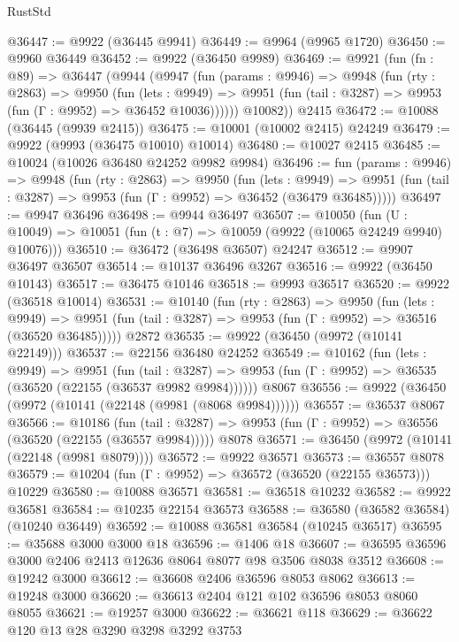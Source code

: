 \begin{lexlean}{RustStd}
\begin{coremodule}
@36447 := @9922 (@36445 @9941)
@36449 := @9964 (@9965 @1720)
@36450 := @9960 @36449
@36452 := @9922 (@36450 @9989)
@36469 := @9921
    (fun (fn : @89) =>
    @36447
      (@9944
        (@9947
          (fun (params : @9946) =>
          @9948
            (fun (rty : @2863) =>
            @9950
              (fun (lets : @9949) =>
              @9951 (fun (tail : @3287) => @9953 (fun (Γ : @9952) => @36452 @10036))))))
        @10082))
    @2415
@36472 := @10088 (@36445 (@9939 @2415))
@36475 := @10001 (@10002 @2415) @24249
@36479 := @9922 (@9993 (@36475 @10010) @10014)
@36480 := @10027 @2415
@36485 := @10024 (@10026 @36480 @24252 @9982 @9984)
@36496 := fun (params : @9946) =>
  @9948
    (fun (rty : @2863) =>
    @9950
      (fun (lets : @9949) =>
      @9951 (fun (tail : @3287) => @9953 (fun (Γ : @9952) => @36452 (@36479 @36485)))))
@36497 := @9947 @36496
@36498 := @9944 @36497
@36507 := @10050
    (fun (U : @10049) => @10051 (fun (t : @7) => @10059 (@9922 (@10065 @24249 @9940) @10076)))
@36510 := @36472 (@36498 @36507) @24247
@36512 := @9907 @36497 @36507
@36514 := @10137 @36496 @3267
@36516 := @9922 (@36450 @10143)
@36517 := @36475 @10146
@36518 := @9993 @36517
@36520 := @9922 (@36518 @10014)
@36531 := @10140
    (fun (rty : @2863) =>
    @9950
      (fun (lets : @9949) =>
      @9951 (fun (tail : @3287) => @9953 (fun (Γ : @9952) => @36516 (@36520 @36485)))))
    @2872
@36535 := @9922 (@36450 (@9972 (@10141 @22149)))
@36537 := @22156 @36480 @24252
@36549 := @10162
    (fun (lets : @9949) =>
    @9951
      (fun (tail : @3287) =>
      @9953 (fun (Γ : @9952) => @36535 (@36520 (@22155 (@36537 @9982 @9984))))))
    @8067
@36556 := @9922 (@36450 (@9972 (@10141 (@22148 (@9981 (@8068 @9984))))))
@36557 := @36537 @8067
@36566 := @10186
    (fun (tail : @3287) => @9953 (fun (Γ : @9952) => @36556 (@36520 (@22155 (@36557 @9984)))))
    @8078
@36571 := @36450 (@9972 (@10141 (@22148 (@9981 @8079))))
@36572 := @9922 @36571
@36573 := @36557 @8078
@36579 := @10204 (fun (Γ : @9952) => @36572 (@36520 (@22155 @36573))) @10229
@36580 := @10088 @36571
@36581 := @36518 @10232
@36582 := @9922 @36581
@36584 := @10235 @22154 @36573
@36588 := @36580 (@36582 @36584) (@10240 @36449)
@36592 := @10088 @36581 @36584 (@10245 @36517)
@36595 := @35688 @3000 @3000 @18
@36596 := @1406 @18
@36607 := @36595 @36596 @3000 @2406 @2413 @12636 @8064 @8077 @98 @3506 @8038 @3512
@36608 := @19242 @3000
@36612 := @36608 @2406 @36596 @8053 @8062
@36613 := @19248 @3000
@36620 := @36613 @2404 @121 @102 @36596 @8053 @8060 @8055
@36621 := @19257 @3000
@36622 := @36621 @118
@36629 := @36622 @120 @13 @28 @3290 @3298 @3292 @3753

\end{coremodule}
\end{lexlean}

